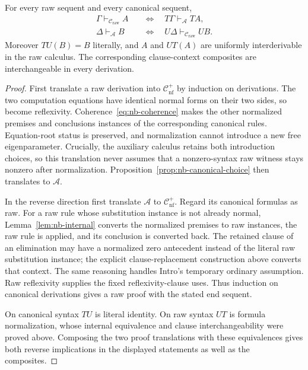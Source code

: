 \begin{theorem}
\label{thm:direct-raw-canonical}
For every raw sequent and every canonical sequent,
\begin{align*}
 \Gamma\vdash_{\mathcal C_{\mathrm{raw}}}A
  &\quad\Longleftrightarrow\quad
        T\Gamma\vdash_{\mathcal A}T A,\\
 \Delta\vdash_{\mathcal A}B
  &\quad\Longleftrightarrow\quad
        U\Delta\vdash_{\mathcal C_{\mathrm{raw}}}U B.
\end{align*}
Moreover $TU(B)=B$ literally, and $A$ and $UT(A)$ are uniformly
interderivable in the raw calculus. The corresponding clause-context
composites are interchangeable in every derivation.
\end{theorem}
\begin{proof}
First translate a raw derivation into $\mathcal C_{\mathrm{nf}}^+$
by induction on derivations. The two computation equations have
identical normal forms on their two sides, so become reflexivity.
Coherence~\eqref{eq:nb-coherence} makes the other normalized
premises and conclusions instances of the corresponding canonical
rules. Equation-root status is preserved, and normalization cannot
introduce a new free eigenparameter. Crucially, the auxiliary calculus
retains both introduction choices, so this translation never assumes
that a nonzero-syntax raw witness stays nonzero after normalization.
Proposition~\ref{prop:nb-canonical-choice} then translates to
$\mathcal A$.

In the reverse direction first translate $\mathcal A$ to
$\mathcal C_{\mathrm{nf}}^+$. Regard its canonical formulas as raw.
For a raw rule whose substitution instance is not already normal,
Lemma~\ref{lem:nb-internal} converts the normalized premises to raw
instances, the raw rule is applied, and its conclusion is converted
back. The retained clause of an elimination may have a normalized
zero antecedent instead of the literal raw substitution instance;
the explicit clause-replacement construction above converts that
context. The same reasoning handles Intro's temporary ordinary
assumption. Raw reflexivity supplies the fixed reflexivity-clause
uses. Thus induction on canonical derivations gives a raw proof
with the stated end sequent.

On canonical syntax $TU$ is literal identity. On raw syntax $UT$
is formula normalization, whose internal equivalence and clause
interchangeability were proved above. Composing the two proof
translations with these equivalences gives both reverse implications
in the displayed statements as well as the composites.
\end{proof}


